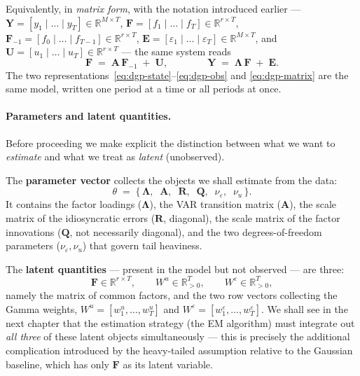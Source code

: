\documentclass[11pt, a4paper, oneside]{article}
\newcommand{\mY}{\mathbf{Y}}
\newcommand{\mF}{\mathbf{F}}
\newcommand{\mL}{\boldsymbol{\Lambda}}
\newcommand{\mE}{\mathbf{E}}
\newcommand{\mA}{\mathbf{A}}
\newcommand{\mR}{\mathbf{R}}
\newcommand{\mQ}{\mathbf{Q}}
\begin{document}
\medskip

Equivalently, in \emph{matrix form}, with the notation introduced earlier —
$\mY = [y_1 \mid \ldots \mid y_T] \in \mathbb{R}^{M \times T}$,
$\mF = [f_1 \mid \ldots \mid f_T] \in \mathbb{R}^{r \times T}$,
$\mF_{-1} = [f_0 \mid \ldots \mid f_{T-1}] \in \mathbb{R}^{r \times T}$,
$\mE = [\varepsilon_1 \mid \ldots \mid \varepsilon_T] \in \mathbb{R}^{M \times T}$,
and $\mathbf{U} = [u_1 \mid \ldots \mid u_T] \in \mathbb{R}^{r \times T}$ — the same
system reads
\begin{equation}
\mF \;=\; \mA\, \mF_{-1} \;+\; \mathbf{U},
\qquad\qquad
\mY \;=\; \mL\, \mF \;+\; \mE.
\label{eq:dgp-matrix}
\end{equation}
The two representations~\eqref{eq:dgp-state}–\eqref{eq:dgp-obs} and
\eqref{eq:dgp-matrix} are the same model, written one period at a time or
all periods at once.

\paragraph{Parameters and latent quantities.}
Before proceeding we make explicit the distinction between what we want
to \emph{estimate} and what we treat as \emph{latent} (unobserved).

The \textbf{parameter vector} collects the objects we shall estimate from
the data:
\[
\theta \;=\; \big\{\, \mL,\;\; \mA,\;\; \mR,\;\; \mQ,\;\; \nu_\varepsilon,\;\; \nu_u \,\big\}.
\]
It contains the factor loadings ($\mL$), the VAR transition matrix
($\mA$), the scale matrix of the idiosyncratic errors ($\mR$, diagonal),
the scale matrix of the factor innovations ($\mQ$, not necessarily
diagonal), and the two degrees-of-freedom parameters
($\nu_\varepsilon, \nu_u$) that govern tail heaviness.

The \textbf{latent quantities} — present in the model but not observed —
are three:
\[
\mF \in \mathbb{R}^{r \times T}, \qquad
W^u \in \mathbb{R}^{T}_{>0}, \qquad
W^\varepsilon \in \mathbb{R}^{T}_{>0},
\]
namely the matrix of common factors, and the two row vectors collecting
the Gamma weights, $W^u = [w^u_1, \ldots, w^u_T]$ and
$W^\varepsilon = [w^\varepsilon_1, \ldots, w^\varepsilon_T]$. We shall see
in the next chapter that the estimation strategy (the EM algorithm) must
integrate out \emph{all three} of these latent objects simultaneously —
this is precisely the additional complication introduced by the
heavy-tailed assumption relative to the Gaussian baseline, which has only
$\mF$ as its latent variable.
\end{document}
